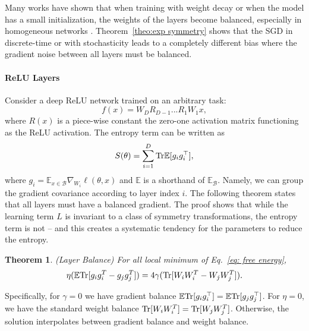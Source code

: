 \documentclass{article}
\theoremstyle{plain}
\newtheorem{theorem}{Theorem}
\newcommand{\E}{\mathbb{E}}
\newcommand{\Tr}{{\rm Tr}}
\begin{document}
Many works have shown that when training with weight decay or when the model has a small initialization, the weights of the layers become balanced, especially in homogeneous networks \cite{du2018algorithmic, polyakov2023homogeneous, rangamani2022neural}. Theorem~\ref{theo:exp symmetry} shows that the SGD in discrete-time or with stochasticity leads to a completely different bias where the gradient noise between all layers must be balanced. %


\paragraph{ReLU Layers} Consider a deep ReLU network trained on an arbitrary task:
\begin{equation}
    f(x) = W_{D} R_{D-1} ... R_1 W_1 x,
\end{equation}
where $R(x)$ is a piece-wise constant the zero-one activation matrix functioning as the ReLU activation. The entropy term can be written as
\begin{equation}
     S(\theta)= \sum_{i=1}^D\Tr \E [g_ig_i^\top],
\end{equation}
where $g_i=\mathbb{E}_{x\in\mathcal{B}}\nabla_{W_i}\ell(\theta,x)$ and $\mathbb{E}$ is a shorthand of $\mathbb{E}_\mathcal{B}$. Namely, we can group the gradient covariance according to layer index $i$. The following theorem states that all layers must have a balanced gradient. The proof shows that while the learning term $L$ is invariant to a class of symmetry transformations, the entropy term is not -- and this creates a systematic tendency for the parameters to reduce the entropy.


\begin{theorem}
\label{theo:layer_balance}
    (Layer Balance) For all local minimum of Eq.~\eqref{eq: free energy}, 
    \begin{equation}
         \eta(\mathbb{E}\Tr[g_ig_i^T-g_jg_j^T])=4\gamma(\Tr[W_iW_i^T-W_jW_j^T]).
    \end{equation}
    
\end{theorem}
Specifically, for $\gamma=0$ we have gradient balance $\E \Tr[g_ig_i^\top] =  \E \Tr[g_jg_j^\top]$. For $\eta=0$, we have the standard weight balance $\Tr[W_iW_i^T]=\Tr[W_jW_j^T]$. Otherwise, the solution interpolates between gradient balance and weight balance.
\end{document}

